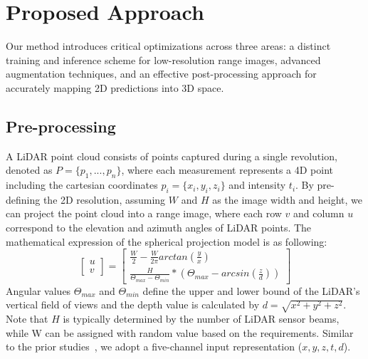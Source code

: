 \section{Proposed Approach}
Our method introduces critical optimizations across three areas: a distinct training and inference scheme for low-resolution range images, advanced augmentation techniques, and an effective post-processing approach for accurately mapping 2D predictions into 3D space.
\subsection{Pre-processing}
\label{subsec:preprocessing}
 A LiDAR point cloud consists of points captured during a single revolution, denoted as \( P = \{p_1, ..., p_n\} \), where each measurement represents a 4D point including the cartesian coordinates \( p_i = \{x_i, y_i, z_i\} \) and intensity \(t_i\). By pre-defining the 2D resolution, assuming \(W\) and \(H\) as the image width and height, we can project the point cloud into a range image, where each row \(v\) and column \(u\) correspond to the elevation and azimuth angles of LiDAR points. The mathematical expression of the spherical projection model is as following:
\begin{equation} \label{eqn:prediction}
\begin{bmatrix} u \\ v \end{bmatrix} = 
\begin{bmatrix} \frac{W}{2}  - \frac{W}{2\pi} arctan(\frac{y}{x}) \\
 \frac{H}{\Theta_{max}-\Theta_{min}} * (\Theta_{max} - arcsin(\frac{z}{d}))
\end{bmatrix}
\end{equation}
Angular values $\Theta_{max}$ and $\Theta_{min}$ define the upper and lower bound of the LiDAR's vertical field of views and the depth value is calculated by $d = \sqrt{x^2 + y^2 + z^2}$. Note that \(H\) is typically determined by the number of LiDAR sensor beams, while W can be assigned with random value based on the requirements. Similar to the prior studies~\cite{cheng2022cenet, zhao2021fidnet, cortinhal2020salsanext}, we adopt a five-channel input representation (\(x, y, z, t, d\)).
